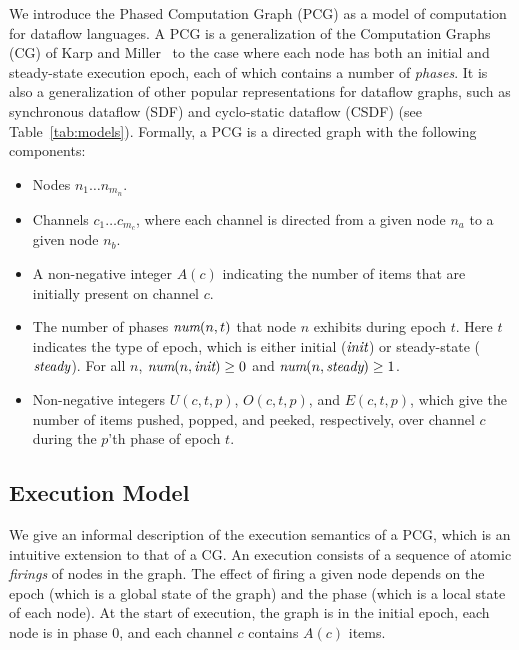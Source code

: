 We introduce the Phased Computation Graph (PCG) as a model of
computation for dataflow languages.  A PCG is a generalization of the
Computation Graphs (CG) of Karp and Miller~\cite{KM66} to the case
where each node has both an initial and steady-state execution epoch,
each of which contains a number of {\it phases}.  It is also a
generalization of other popular representations for dataflow graphs,
such as synchronous dataflow (SDF) and cyclo-static dataflow (CSDF)
(see Table~\ref{tab:models}).  Formally, a PCG is a directed graph
with the following components:
\begin{itemize}

\item Nodes $n_1 \dots n_{m_n}$.

\item Channels $c_1 \dots c_{m_c}$, where each channel is directed
from a given node $n_a$ to a given node $n_b$.

\item A non-negative integer $A(c)$ indicating the number of items
  that are initially present on channel $c$.

\item The number of phases $\mbox{\it num}(n, t)$ that node $n$ exhibits
during epoch $t$.  Here $t$ indicates the type of epoch, which is
either initial ($\mbox{\it init}$) or steady-state ($\mbox{\it steady}$).  For all
$n$, $\mbox{\it num}(n, \mbox{\it init}) \ge 0$ and $\mbox{\it num}(n, \mbox{\it steady}) \ge
1$.

\item Non-negative integers $U(c, t, p)$, $O(c, t, p)$, and $E(c, t,
p)$, which give the number of items pushed, popped, and peeked,
respectively, over channel $c$ during the $p$'th phase of epoch $t$.

\end{itemize}

\subsection{Execution Model}

We give an informal description of the execution semantics of a PCG,
which is an intuitive extension to that of a CG.  An execution
consists of a sequence of atomic {\it firings} of nodes in the graph.
The effect of firing a given node depends on the epoch (which is a
global state of the graph) and the phase (which is a local state of
each node). At the start of execution, the graph is in the initial
epoch, each node is in phase 0, and each channel $c$ contains $A(c)$
items.

